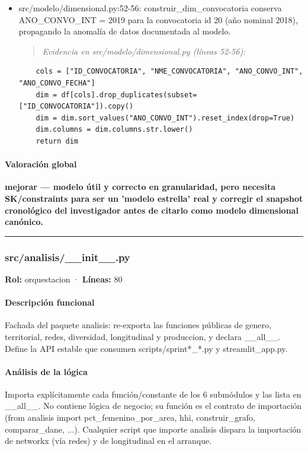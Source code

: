 \begin{tcolorbox}[riesgo]
\begin{itemize}
  \item src/modelo/dimensional.py:52-56: construir\_dim\_convocatoria conserva ANO\_CONVO\_INT = 2019 para la convocatoria id 20 (año nominal 2018), propagando la anomalía de datos documentada al modelo.
\begin{quote}\footnotesize\ttfamily
\noindent\emph{Evidencia en src/modelo/dimensional.py (líneas 52-56):}
\end{quote}
\begin{lstlisting}
    cols = ["ID_CONVOCATORIA", "NME_CONVOCATORIA", "ANO_CONVO_INT", "ANO_CONVO_FECHA"]
    dim = df[cols].drop_duplicates(subset=["ID_CONVOCATORIA"]).copy()
    dim = dim.sort_values("ANO_CONVO_INT").reset_index(drop=True)
    dim.columns = dim.columns.str.lower()
    return dim
\end{lstlisting}

\end{itemize}
\end{tcolorbox}

\paragraph{Valoración global}
\textbf{mejorar --- modelo útil y correcto en granularidad, pero necesita SK/constraints para ser un 'modelo estrella' real y corregir el snapshot cronológico del investigador antes de citarlo como modelo dimensional canónico.}

\medskip
\hrule

\subsubsection{src/analisis/\_\_init\_\_.py}
\textbf{Rol:} orquestacion · \textbf{Líneas:} 80

\paragraph{Descripción funcional}
Fachada del paquete analisis: re-exporta las funciones públicas de genero, territorial, redes, diversidad, longitudinal y produccion, y declara \_\_all\_\_. Define la API estable que consumen scripts/sprint*\_*.py y streamlit\_app.py.

\paragraph{Análisis de la lógica}
Importa explícitamente cada función/constante de los 6 submódulos y las lista en \_\_all\_\_. No contiene lógica de negocio; su función es el contrato de importación (from analisis import pct\_femenino\_por\_area, hhi, construir\_grafo, comparar\_dane, ...). Cualquier script que importe analisis dispara la importación de networkx (vía redes) y de longitudinal en el arranque.

